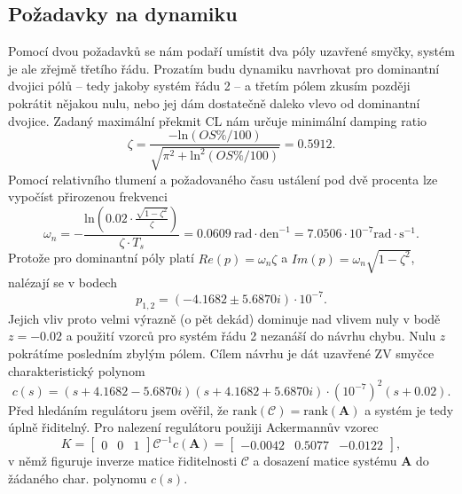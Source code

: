 \documentclass[twoside]{article}
\begin{document}
\subsection{Požadavky na dynamiku}
Pomocí dvou požadavků se nám podaří umístit dva póly uzavřené smyčky, systém je ale zřejmě třetího řádu. Prozatím budu dynamiku 
navrhovat pro dominantní dvojici pólů -- tedy jakoby systém řádu 2 -- a třetím pólem zkusím později pokrátit nějakou nulu, nebo jej 
dám dostatečně daleko vlevo od dominantní dvojice. Zadaný maximální překmit CL nám určuje minimální damping ratio
\begin{equation}
	\zeta = \frac{- \text{ln}(OS\%/100)}{\sqrt{\pi^2 + \text{ln}^2(OS\%/100)}} = 0.5912.
\end{equation}
Pomocí relativního tlumení a požadovaného času ustálení pod dvě procenta lze vypočíst přirozenou frekvenci
\begin{equation}
	\omega_n =  -\frac{\text{ln}(0.02 \cdot \frac{\sqrt{1-\zeta^2}}{\zeta})}{\zeta \cdot T_s} = 0.0609~\text{rad} \cdot \text{den}^{-1} = 7.0506 \cdot 10^{-7} \text{rad} \cdot \text{s}^{-1}.
\end{equation}
Protože pro dominantní póly platí $Re(p) = \omega_n \zeta$ a $Im(p) = \omega_n \sqrt{1-\zeta^2}$, nalézají se v bodech 
\begin{equation}
	p_{1,2} = (-4.1682 \pm 5.6870i) \cdot 10^{-7}.
\end{equation}
Jejich vliv proto velmi výrazně (o pět dekád) dominuje nad vlivem nuly v bodě $z = -0.02$ a použití vzorců pro systém řádu 2 nezanáší do návrhu chybu.
Nulu $z$ pokrátíme posledním zbylým pólem. Cílem návrhu je dát uzavřené ZV smyčce charakteristický polynom
\begin{equation}
	c(s) = (s+4.1682 -5.6870i)(s + 4.1682 +5.6870i) \cdot \left(10^{-7}\right)^2 (s+0.02).
\end{equation}
Před hledáním regulátoru jsem ověřil, že $\text{rank}(\mathcal{C}) = \text{rank}(\mathbf{A})$ a systém je tedy úplně řiditelný.
Pro nalezení regulátoru použiji Ackermannův vzorec
\begin{equation}
	K = \begin{bmatrix}
		0 & 0 & 1
	\end{bmatrix} \mathcal{C}^{-1}  c(\mathbf{A}) = \begin{bmatrix}
		-0.0042 & 0.5077 & -0.0122
	\end{bmatrix},
\end{equation}
v němž figuruje inverze matice řiditelnosti $\mathcal{C}$ a dosazení matice systému $\mathbf{A}$ do žádaného char. polynomu $c(s)$.
\end{document}

